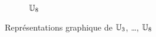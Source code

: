 \begin{figure}
\begin{subfigure}{.3\textwidth}
                          \caption{$\mathbb{U}_8$}
                          \label{fig:U8}      
                        \end{subfigure}
                        \caption{Représentations graphique de \(\mathbb{U}_3\), \ldots, \(\mathbb{U}_{8}\)}
                        \label{fig:racinesnieme}
                      \end{figure}

